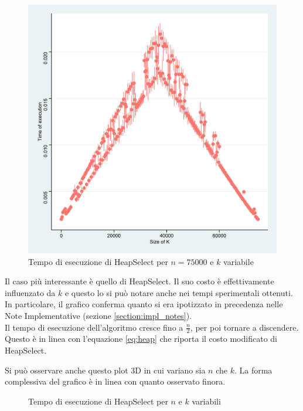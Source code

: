 \documentclass{article}
\begin{document}
	\begin{figure}[h!]
  		\includegraphics[width=\linewidth]{images/HeapSelect_Kvariable.png}
  		\caption{Tempo di esecuzione di HeapSelect per $n=75000$ e $k$ variabile}
  		\label{fig:graph4}
	\end{figure}
	
	Il caso più interessante è quello di HeapSelect. Il suo costo è effettivamente influenzato da $k$ e questo lo si può notare anche nei tempi sperimentali ottenuti. In particolare, il grafico conferma quanto si era ipotizzato in precedenza nelle Note Implementative (sezione \ref{section:impl_notes}). 
	\\
	Il tempo di esecuzione dell'algoritmo cresce fino a $\frac{n}{2}$, per poi tornare a discendere. Questo è in linea con l'equazione \eqref{eq:heap} che riporta il costo modificato di HeapSelect.
	
	
	\newpage
	Si può osservare anche questo plot 3D in cui variano sia $n$ che $k$. La forma complessiva del grafico è in linea con quanto osservato finora. 
	
	\begin{figure}[h!]
		\centering
  		\caption{Tempo di esecuzione di HeapSelect per $n$ e $k$ variabili}
  		\label{fig:graph5}
	\end{figure}
		
\end{document}
